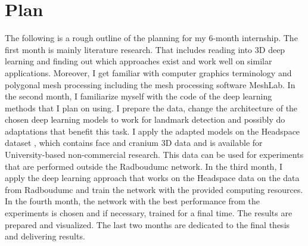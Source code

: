 \documentclass{article}
\begin{document}
 \section{Plan}
The following is a rough outline of the planning for my 6-month internship. The first month is mainly literature research. That includes reading into 3D deep learning and finding out which approaches exist and work well on similar applications. Moreover, I get familiar with computer graphics terminology and polygonal mesh processing \cite{botsch2010polygon} including the mesh processing software MeshLab. In the second month, I familiarize myself with the code of the deep learning methods that I plan on using. I prepare the data, change the architecture of the chosen deep learning models to work for landmark detection and possibly do adaptations that benefit this task. I apply the adapted models on the Headspace dataset \cite{Dai2020}, which contains face and cranium 3D data and is available for University-based non-commercial research. This data can be used for experiments that are performed outside the Radboudumc network. In the third month, I apply the deep learning approach that works on the Headspace data on the data from Radboudumc and train the network with the provided computing resources. In the fourth month, the network with the best performance from the experiments is chosen and if necessary, trained for a final time. The results are prepared and visualized. The last two months are dedicated to the final thesis and delivering results.
\end{document}
